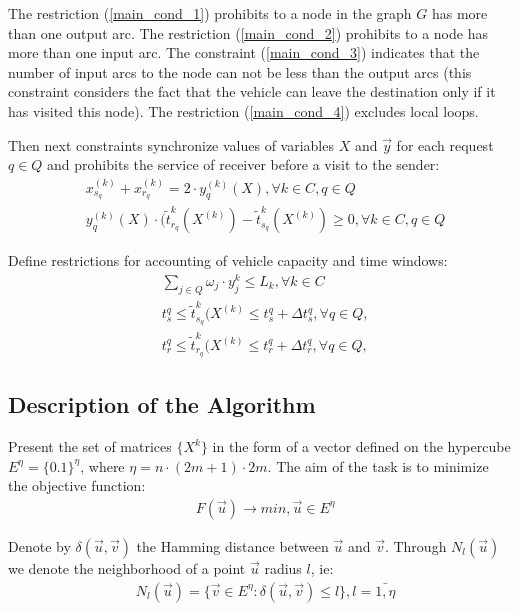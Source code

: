 \documentclass[]{TAACpaper}
\begin{document}
The restriction (\ref{main_cond_1}) prohibits to a node in the graph $G$ has more than one output arc. The restriction (\ref{main_cond_2}) prohibits to a node has more than one input arc.  The constraint (\ref{main_cond_3}) indicates that the number of input arcs to the node can not be less than the output arcs (this constraint considers the fact that the vehicle can leave the destination only if it has visited this node). The restriction (\ref{main_cond_4}) excludes local loops.

Then next constraints synchronize values of variables $X$ and $\vec{y}$ for each request $q \in Q$ and prohibits the service of receiver before a visit to the sender:
\begin{align} 
& x^{(k)}_{s_q} + x^{(k)}_{r_q} = 2 \cdot y^{(k)}_{q}(X), \forall k \in C, q \in Q  \\
& y^{(k)}_{q}(X) \cdot (\tilde{t}^k_{r_q}(X^{(k)})-\tilde{t}^k_{s_q}(X^{(k)})\ge{0}, \forall k \in C, q \in Q
\end{align}

Define restrictions for accounting of vehicle capacity and time windows:
\begin{align} 
& \sum_{j\in{Q}} \omega_j \cdot y_{j}^{k} \leq L_k, \forall{k}\in{C}\\
& t_{s}^{q} \leq \tilde{t}^k_{s_q}(X^{(k)} \leq t_{s}^{q}+ \Delta{t_{s}^{q}}, \forall q \in Q, \label{tws_cond} \\
& t_{r}^{q} \leq \tilde{t}^k_{r_q}(X^{(k)} \leq t_{r}^{q}+ \Delta{t_{r}^{q}}, \forall q \in Q, \label{twr_cond}
\end{align}



\subsection{Description of the Algorithm}
Present the set of matrices $\{X^k\}$ in the form of a vector defined on the hypercube $E^\eta=\{0.1\}^\eta$, where $\eta=n\cdot(2m+1)\cdot 2m$. The aim of the task is to minimize the objective function:
\begin{align} 
& F(\vec{u})\to min,\vec{u}\in E^{\eta}
\end{align}	

Denote by $\delta(\vec{u},\vec{v})$ the Hamming distance between $\vec{u}$ and $\vec{v}$. Through $N_l(\vec{u})$ we denote the neighborhood of a point $\vec{u}$ radius $l$, ie:
\begin{align} 
& N_l(\vec{u})=\{\vec{v} \in E^{\eta}:\delta(\vec{u},\vec{v})\le l \}, l=\bar{1,\eta}
\end{align}	
\end{document}
